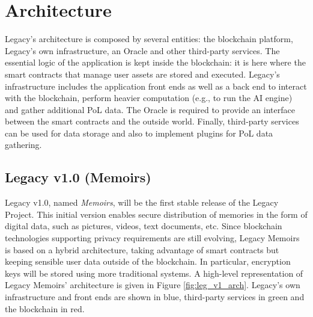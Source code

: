 \chapter{Architecture} %
\label{cha:architecture}

Legacy’s architecture is composed by several entities: the blockchain platform, Legacy’s own infrastructure, an Oracle and other third-party services. 
The essential logic of the application is kept inside the blockchain: it is here where the smart contracts that manage user assets are stored and executed. 
Legacy's infrastructure includes the application front ends as well as a back end to interact with the blockchain, perform heavier computation (e.g., to run the AI engine) and gather additional PoL data.
The Oracle is required to provide an interface between the smart contracts and the outside world.
Finally, third-party services can be used for data storage and also to implement plugins for PoL data gathering.


\section{Legacy v1.0 (Memoirs)} %
\label{sec:legacy_v1_0_memoirs_a_hybrid_architecture}
Legacy v1.0, named \textit{Memoirs}, will be the first stable release of the Legacy Project. This initial version enables secure distribution of memories in the form of digital data, such as pictures, videos, text documents, etc. 
Since blockchain technologies supporting privacy requirements are still evolving, Legacy Memoirs is based on a hybrid architecture, taking advantage of smart contracts but keeping sensible user data outside of the blockchain. In particular, encryption keys will be stored using more traditional systems.
A high-level representation of Legacy Memoirs’ architecture is given in Figure \ref{fig:leg_v1_arch}. Legacy’s own infrastructure and front ends are shown in blue, third-party services in green and the blockchain in red. 

